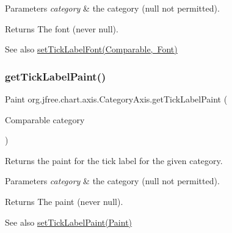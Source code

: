 \begin{DoxyParams}{Parameters}
{\em category} & the category ({\ttfamily null} not permitted).\\
\hline
\end{DoxyParams}
\begin{DoxyReturn}{Returns}
The font (never {\ttfamily null}).
\end{DoxyReturn}
\begin{DoxySeeAlso}{See also}
\mbox{\hyperlink{classorg_1_1jfree_1_1chart_1_1axis_1_1_category_axis_aa352e3ac25d24cf67ec08c85d1417005}{set\+Tick\+Label\+Font(\+Comparable, Font)}} 
\end{DoxySeeAlso}
\mbox{\label{classorg_1_1jfree_1_1chart_1_1axis_1_1_category_axis_a3cda1e89a63b0151e4e61ff531f0018f}} 
\subsubsection{\texorpdfstring{get\+Tick\+Label\+Paint()}{getTickLabelPaint()}}
{\footnotesize\ttfamily Paint org.\+jfree.\+chart.\+axis.\+Category\+Axis.\+get\+Tick\+Label\+Paint (\begin{DoxyParamCaption}\item[{Comparable}]{category }\end{DoxyParamCaption})}

Returns the paint for the tick label for the given category.


\begin{DoxyParams}{Parameters}
{\em category} & the category ({\ttfamily null} not permitted).\\
\hline
\end{DoxyParams}
\begin{DoxyReturn}{Returns}
The paint (never {\ttfamily null}).
\end{DoxyReturn}
\begin{DoxySeeAlso}{See also}
\mbox{\hyperlink{classorg_1_1jfree_1_1chart_1_1axis_1_1_axis_a5ce2c0a548ab9ccc1946f4495120f78a}{set\+Tick\+Label\+Paint(\+Paint)}} 
\end{DoxySeeAlso}
\mbox{\label{classorg_1_1jfree_1_1chart_1_1axis_1_1_category_axis_a3495765b4523a50ae7e352292bdb3ae4}} 
